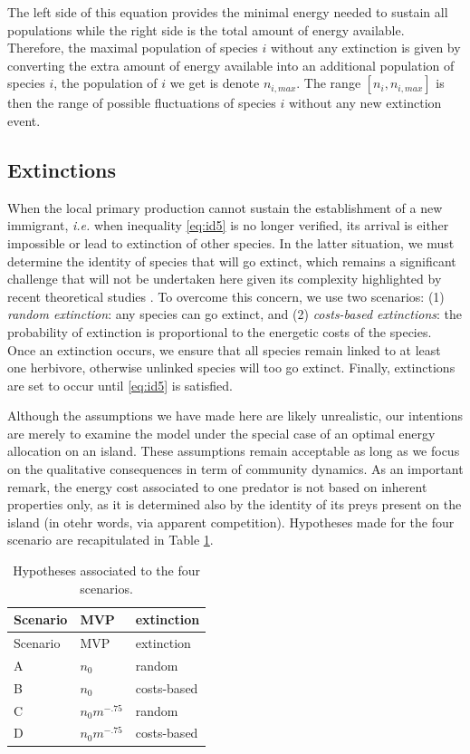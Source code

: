 The left side of this equation provides the minimal energy needed to
sustain all populations while the right side is the total amount of
energy available. Therefore, the maximal population of species \(i\)
without any extinction is given by converting the extra amount of energy
available into an additional population of species \(i\), the population
of \(i\) we get is denote \(n_{i,max}\). The range \([n_i, n_{i, max}]\)
is then the range of possible fluctuations of species \(i\) without any
new extinction event.

\subsection{Extinctions}\label{extinctions}

When the local primary production cannot sustain the establishment of a
new immigrant, \emph{i.e.} when inequality \ref{eq:id5} is no longer
verified, its arrival is either impossible or lead to extinction of
other species. In the latter situation, we must determine the identity
of species that will go extinct, which remains a significant challenge
that will not be undertaken here given its complexity highlighted by
recent theoretical studies \citep{Saterberg2013, Zhao2016}. To overcome
this concern, we use two scenarios: (1) \emph{random extinction}: any
species can go extinct, and (2) \emph{costs-based extinctions}: the
probability of extinction is proportional to the energetic costs of the
species. Once an extinction occurs, we ensure that all species remain
linked to at least one herbivore, otherwise unlinked species will too go
extinct. Finally, extinctions are set to occur until \ref{eq:id5} is
satisfied.

Although the assumptions we have made here are likely unrealistic, our
intentions are merely to examine the model under the special case of an
optimal energy allocation on an island. These assumptions remain
acceptable as long as we focus on the qualitative consequences in term
of community dynamics. As an important remark, the energy cost
associated to one predator is not based on inherent properties only, as
it is determined also by the identity of its preys present on the island
(in otehr words, via apparent competition). Hypotheses made for the four
scenario are recapitulated in Table \ref{tbl:scena}.

\begin{longtable}[]{@{}lll@{}}
\caption{Hypotheses associated to the four scenarios.
\label{tbl:scena}}\tabularnewline
\toprule
Scenario & MVP & extinction\tabularnewline
\midrule
\endfirsthead
\toprule
Scenario & MVP & extinction\tabularnewline
\midrule
\endhead
A & \(n_0\) & random\tabularnewline
B & \(n_0\) & costs-based\tabularnewline
C & \(n_0m^{-.75}\) & random\tabularnewline
D & \(n_0m^{-.75}\) & costs-based\tabularnewline
\bottomrule
\end{longtable}

